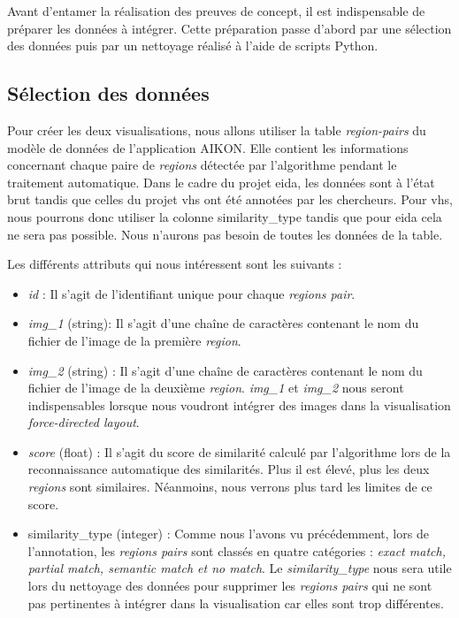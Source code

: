 Avant d'entamer la réalisation des preuves de concept, il est indispensable de préparer les données à intégrer. Cette préparation passe d'abord par une sélection des données puis par un nettoyage réalisé à l'aide de scripts Python.

\subsection{Sélection des données}

Pour créer les deux visualisations, nous allons utiliser la table \textit{region-pairs} du modèle de données de l'application AIKON. Elle contient les informations concernant chaque paire de \textit{regions} détectée par l'algorithme pendant le traitement automatique. Dans le cadre du projet \gls{eida}, les données sont à l'état brut tandis que celles du projet \gls{vhs} ont été annotées par les chercheurs. Pour \gls{vhs}, nous pourrons donc utiliser la colonne \og similarity\_type \fg tandis que pour \gls{eida} cela ne sera pas possible. Nous n'aurons pas besoin de toutes les données de la table.

Les différents attributs qui nous intéressent sont les suivants : 

\begin{itemize}
	\item \textit{id} : Il s'agit de l'identifiant unique pour chaque \textit{regions pair}.
	\item \textit{img\_1} (string): Il s'agit d'une chaîne de caractères contenant le nom du fichier de l'image de la première \textit{region}. 
	\item \textit{img\_2} (string) : Il s'agit d'une chaîne de caractères contenant le nom du fichier de l'image de la deuxième \textit{region}. \textit{img\_1} et \textit{img\_2} nous seront indispensables lorsque nous voudront intégrer des images dans la visualisation \textit{force-directed layout}.
	\item \textit{score} (float) : Il s'agit du score de similarité calculé par l'algorithme lors de la reconnaissance automatique des similarités. Plus il est élevé, plus les deux \textit{regions} sont similaires. Néanmoins, nous verrons plus tard les limites de ce score.
	\item similarity\_type (integer) : Comme nous l'avons vu précédemment, lors de l'annotation, les \textit{regions pairs} sont classés en quatre catégories : \textit{exact match, partial match, semantic match et no match}. Le \textit{similarity\_type} nous sera utile lors du nettoyage des données pour supprimer les \textit{regions pairs} qui ne sont pas pertinentes à intégrer dans la visualisation car elles sont trop différentes. 
\end{itemize}

